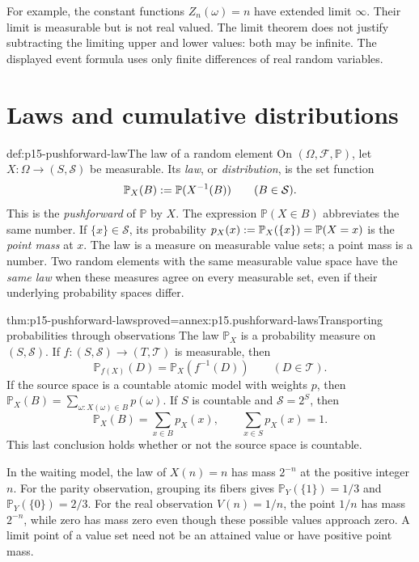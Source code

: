 For example, the constant functions \(Z_n(\omega)=n\) have extended
limit \(\infty\). Their limit is measurable but is not real valued.
The limit theorem does not justify subtracting the limiting upper and
lower values: both may be infinite. The displayed event formula uses
only finite differences of real random variables.

\section{Laws and cumulative distributions}
\label{sec:p15-laws-distributions}

\begin{hbdefinition}{def:p15-pushforward-law}{The law of a random element}
On \((\Omega,\mathcal F,\mathbb P)\), let
\(X:\Omega\to(S,\mathcal S)\) be measurable. Its \emph{law}, or
\emph{distribution}, is the set function
\[
 \mathbb P_X(B)\mathrel{:=}\mathbb P(X^{-1}(B))
                  \qquad(B\in\mathcal S).
\]
This is the \emph{pushforward} of \(\mathbb P\) by \(X\).
The expression \(\mathbb P(X\in B)\) abbreviates the same number.
If \(\{x\}\in\mathcal S\), its probability
\(p_X(x)\mathrel{:=}\mathbb P_X(\{x\})=\mathbb P(X=x)\) is the
\emph{point mass} at \(x\). The law is a measure on measurable value
sets; a point mass is a number. Two random elements with the same
measurable value space have the \emph{same law} when these measures agree
on every measurable set, even if their underlying probability spaces differ.
\end{hbdefinition}

\begin{hbtheorem}{thm:p15-pushforward-laws}{proved=annex:p15.pushforward-laws}{Transporting probabilities through observations}
The law \(\mathbb P_X\) is a probability measure on \((S,\mathcal S)\).
If \(f:(S,\mathcal S)\to(T,\mathcal T)\) is measurable, then
\[
 \mathbb P_{f(X)}(D)=\mathbb P_X(f^{-1}(D))\qquad(D\in\mathcal T).
\]
If the source space is a countable atomic model with weights \(p\),
then \(\mathbb P_X(B)=\sum_{\omega:X(\omega)\in B}p(\omega)\).
If \(S\) is countable and \(\mathcal S=2^S\), then
\[
 \mathbb P_X(B)=\sum_{x\in B}p_X(x),\qquad
 \sum_{x\in S}p_X(x)=1.
\]
This last conclusion holds whether or not the source space is countable.
\end{hbtheorem}

In the waiting model, the law of \(X(n)=n\) has mass \(2^{-n}\) at
the positive integer \(n\). For the parity observation, grouping its
fibers gives \(\mathbb P_Y(\{1\})=1/3\) and
\(\mathbb P_Y(\{0\})=2/3\). For the real observation \(V(n)=1/n\),
the point \(1/n\) has mass \(2^{-n}\), while zero has mass zero even
though these possible values approach zero. A limit point of a value set
need not be an attained value or have positive point mass.

